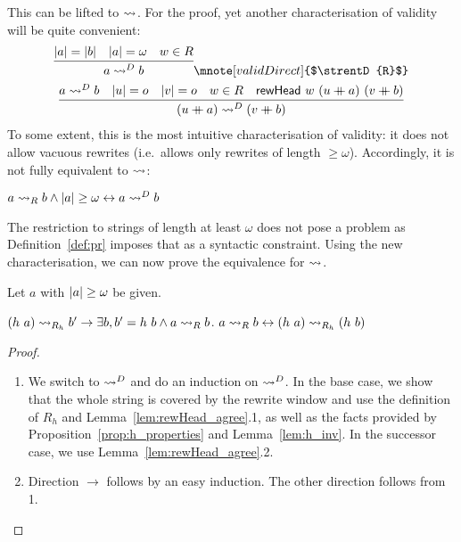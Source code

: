 This can be lifted to $\strent{}$. For the proof, yet another characterisation of validity will be quite convenient:
\begin{gather*}
  \infer{a \strentD{R} b}{\length{a} = \length{b} \quad \length{a} = \omega \quad w \in R}
  \mnote[validDirect]{$\strentD{R}$}\\
  \infer{(u \concat a) \strentD{R} (v \concat b)}{a \strentD{R} b \quad \length{u} = o \quad \length{v} = o \quad w \in R \quad \rewHead{w}{(u \concat a)}{(v \concat b)}}
\end{gather*}
To some extent, this is the most intuitive characterisation of validity: it does not allow vacuous rewrites (i.e.\ allows only rewrites of length $\ge \omega$). Accordingly, it is not fully equivalent to $\strent{}$:
\begin{lemma}
  $a \strent{R} b \land \length{a} \ge \omega \leftrightarrow a \strentD{R} b$
\end{lemma}

The restriction to strings of length at least $\omega$ does not pose a problem as Definition~\ref{def:pr} imposes that as a syntactic constraint.
Using the new characterisation, we can now prove the equivalence for $\strent{}$.
\begin{lemma}
  Let $a$ with $\length{a} \ge \omega$ be given.
  \begin{enumerate}
     $(h~a) \strent{R_h} b' \rightarrow \exists b, b' = h~b \land a \strent{R} b$. 
     $a \strent{R} b \leftrightarrow (h~a) \strent{R_h} (h~b)$
  \end{enumerate}
\end{lemma}
\begin{proof}
  \begin{enumerate}
    \item We switch to $\strentD{}$ and do an induction on $\strentD{}$. In the base case, we show that the whole string is covered by the rewrite window and use the definition of $R_h$ and Lemma~\ref{lem:rewHead_agree}.1, as well as the facts provided by Proposition~\ref{prop:h_properties} and Lemma~\ref{lem:h_inv}.
      In the successor case, we use Lemma~\ref{lem:rewHead_agree}.2.
    \item Direction $\rightarrow$ follows by an easy induction. The other direction follows from 1.
  \end{enumerate}
\end{proof}


